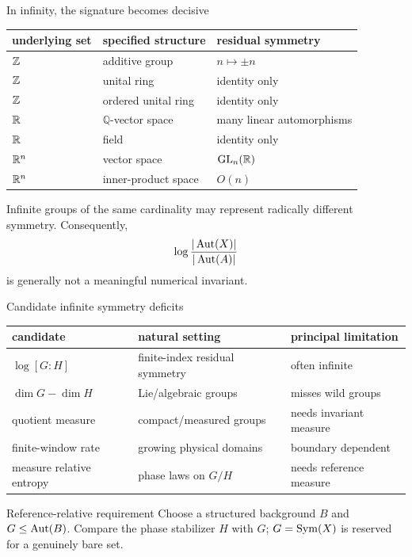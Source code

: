 \begin{frame}{In infinity, the signature becomes decisive}
  \small
  \centering
  \begin{tabular}{lll}
    \toprule
    underlying set & specified structure & residual symmetry \\
    \midrule
    $\mathbb{Z}$ & additive group & $n\mapsto\pm n$ \\
    $\mathbb{Z}$ & unital ring & identity only \\
    $\mathbb{Z}$ & ordered unital ring & identity only \\
    $\mathbb{R}$ & $\mathbb Q$-vector space & many linear automorphisms \\
    $\mathbb{R}$ & field & identity only \\
    $\mathbb{R}^n$ & vector space & $\mathrm{GL}_n(\mathbb{R})$ \\
    $\mathbb{R}^n$ & inner-product space & $O(n)$ \\
    \bottomrule
  \end{tabular}

  \vspace{0.4em}
  Infinite groups of the same cardinality may represent radically different
  symmetry. Consequently,
  \[
    \log\frac{|\operatorname{Aut}(X)|}{|\operatorname{Aut}(A)|}
  \]
  is generally not a meaningful numerical invariant.
\end{frame}

\begin{frame}{Candidate infinite symmetry deficits}
  \centering
  \begin{tabular}{lll}
    \toprule
    candidate & natural setting & principal limitation \\
    \midrule
    $\log[G:H]$ & finite-index residual symmetry & often infinite \\
    $\dim G-\dim H$ & Lie/algebraic groups & misses wild groups \\
    quotient measure & compact/measured groups & needs invariant measure \\
    finite-window rate & growing physical domains & boundary dependent \\
    measure relative entropy & phase laws on $G/H$ & needs reference measure \\
    \bottomrule
  \end{tabular}

  \vspace{0.7em}
  \begin{block}{Reference-relative requirement}
    Choose a structured background $B$ and $G\leq\operatorname{Aut}(B)$. Compare the phase
    stabilizer $H$ with $G$; $G=\operatorname{Sym}(X)$ is reserved for a genuinely bare set.
  \end{block}
\end{frame}

